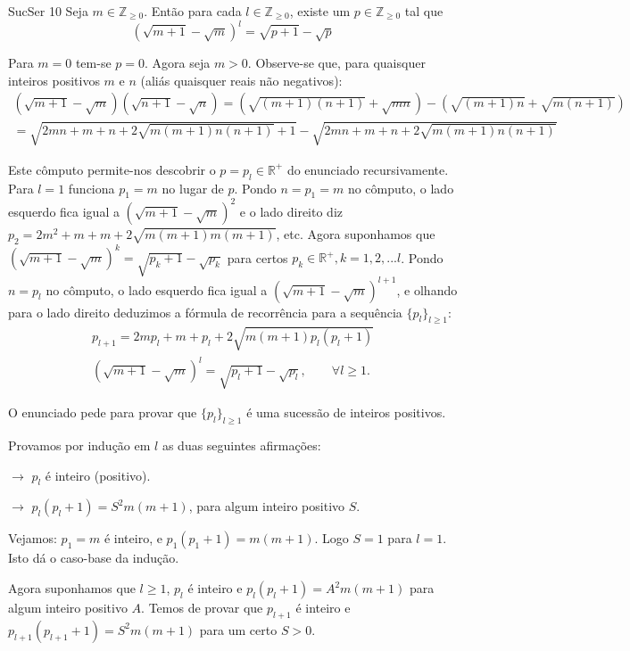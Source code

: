\documentclass[main.tex]{subfiles}
\begin{document}
\begin{problem}{SucSer 10}
Seja $m\in\mathbb{Z}_{\geq 0}$. Então para cada $l\in\mathbb{Z}_{\geq 0}$,
existe um $p\in\mathbb{Z}_{\geq 0}$ tal que
\begin{equation*}
(\sqrt{m+1}-\sqrt{m})^l=\sqrt{p+1}-\sqrt{p}
\end{equation*}
\end{problem}

\begin{solution}
Para $m=0$ tem-se $p=0$.
Agora seja $m>0$.
Observe-se que, para quaisquer inteiros positivos $m$ e $n$
(aliás quaisquer reais não negativos):
\begin{align*}
(\sqrt{m+1}-\sqrt{m})(\sqrt{n+1}-\sqrt{n})
=(\sqrt{(m+1)(n+1)}+\sqrt{mn})-(\sqrt{(m+1)n}+\sqrt{m(n+1)}) \\
=\sqrt{2mn+m+n+2\sqrt{m(m+1)n(n+1)}+1}-\sqrt{2mn+m+n+2\sqrt{m(m+1)n(n+1)}}
\end{align*}

Este cômputo permite-nos descobrir o $p=p_l\in\mathbb{R}^+$
do enunciado recursivamente.
Para $l=1$ funciona $p_1=m$ no lugar de $p$.
Pondo $n=p_1=m$ no cômputo, o lado esquerdo fica igual a
$(\sqrt{m+1}-\sqrt{m})^2$ e o lado direito diz
$p_2=2m^2+m+m+2\sqrt{m(m+1)m(m+1)}$, etc.
Agora suponhamos que $(\sqrt{m+1}-\sqrt{m})^k=\sqrt{p_k+1}-\sqrt{p_k}$
para certos $p_k\in\mathbb{R}^+, k=1,2,...l$.
Pondo $n=p_l$ no cômputo, o lado esquerdo fica igual a
$(\sqrt{m+1}-\sqrt{m})^{l+1}$, e olhando para o lado direito
deduzimos a fórmula de recorrência para a sequência $\{p_l\}_{l\geq 1}$:
\begin{align*}
p_{l+1}=2mp_l+m+p_l+2\sqrt{m(m+1)p_l(p_l+1)} \\
(\sqrt{m+1}-\sqrt{m})^l=\sqrt{p_l+1}-\sqrt{p_l},\qquad \forall l\geq 1.
\end{align*}

O enunciado pede para provar que $\{p_l\}_{l\geq 1}$
é uma sucessão de inteiros positivos.

Provamos por indução em $l$ as duas seguintes afirmações:

$\rightarrow$  $p_l$ é inteiro (positivo).

$\rightarrow$  $p_l(p_l+1)=S^2m(m+1)$, para algum inteiro positivo $S$.

Vejamos: $p_1=m$ é inteiro, e $p_1(p_1+1)=m(m+1)$. Logo $S=1$ para $l=1$.
Isto dá o caso-base da indução.

Agora suponhamos que $l\geq 1$, $p_l$ é inteiro e $p_l(p_l+1)=A^2m(m+1)$
para algum inteiro positivo $A$.
Temos de provar que $p_{l+1}$ é inteiro e $p_{l+1}(p_{l+1}+1)=S^2m(m+1)$
para um certo $S>0$.


\end{solution}
\end{document}
